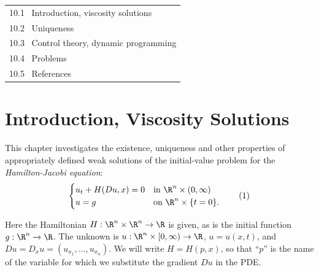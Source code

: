 %


\begin{center}
\begin{tabular}{l}
10.1 \ Introduction, viscosity solutions \\
10.2 \ Uniqueness \\
10.3 \ Control theory, dynamic programming \\
10.4 \ Problems \\
10.5 \ References
\end{tabular}
\end{center}

\section{Introduction, Viscosity Solutions}
\label{sec:hj-introduction-viscosity-solutions}

This chapter investigates the existence, uniqueness and other properties of appropriately defined weak solutions of the initial-value problem for the \textit{Hamilton-Jacobi equation}:
\[
\begin{cases}
u_t + H(Du, x) = 0 & \text{in } \R^n \times (0, \infty) \\
u = g & \text{on } \R^n \times \{t = 0\}.
\end{cases}
\tag{1}
\]

Here the Hamiltonian $H : \R^n \times \R^n \to \R$ is given, as is the initial function $g : \R^n \to \R$. The unknown is $u : \R^n \times [0, \infty) \to \R$, $u = u(x,t)$, and $Du = D_x u = (u_{x_1}, \ldots, u_{x_n})$. We will write $H = H(p, x)$, so that ``$p$'' is the name of the variable for which we substitute the gradient $Du$ in the PDE.

